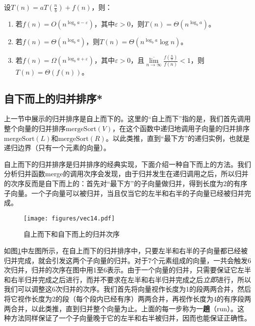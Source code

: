 \begin{theorem}[主定理]
设$T(n) = aT\left(\frac nb\right) + f(n)$，则：
\begin{enumerate}
    \item 若$f(n) = O\left(n^{\log _b a - \varepsilon}\right)$，其中$\varepsilon > 0$，则$T(n) = \Theta\left(n ^ {\log _b a}\right)$。
    \item 若$f(n) = \Theta\left(n^{\log _b a}\right)$，则$T(n) = \Theta\left(n ^ {\log _b a}\log n\right)$。
    \item 若$f(n) = \Omega\left(n^{\log _b a + \varepsilon}\right)$，其中$\varepsilon > 0$，且$\overline{\lim\limits_{n\to\infty}}\frac{f\left(\frac{n}b\right)}{f(n)}<1$，则$T(n) = \Theta\left(f(n)\right)$。
\end{enumerate}

\end{theorem}

\subsection{自下而上的归并排序*}
\label{sec:自下而上的归并排序}
上一节中展示的归并排序是自上而下的。这里的“自上而下”指的是，我们首先调用整个向量的归并排序$\mathrm{mergeSort}(V)$，在这个函数中递归地调用子向量的归并排序$\mathrm{mergeSort}(L)$和$\mathrm{mergeSort}(R)$。以此类推，直到“最下方”的递归实例，也就是递归边界（只有一个元素的向量）。

自上而下的归并排序是归并排序的经典实现，下面介绍一种自下而上的方法。我们分析归并函数merge的调用次序会发现，由于归并发生在递归调用之后，所以归并的次序反而是自下而上的：首先对“最下方”的子向量做归并，得到长度为2的有序子向量。一个子向量可以被归并，当且仅当它的左半和右半的子向量已经被归并完成。

\begin{figure}
  \centering
  \texttt{[image: figures/vec14.pdf]}
  \caption{自上而下和自下而上的归并次序}
  \label{fig:vec14}
\end{figure}

如图\ref{fig:vec14}中左图所示，在自上而下的归并排序中，只要左半和右半的子向量都已经被归并完成，就会引发这两个子向量的归并。对于7个元素组成的向量，一共会触发6次归并，归并的次序在图中用1至6表示。由于一个向量的归并，只需要保证它左半和右半归并完成之后进行，而并不要求在左半和右半归并完成之后\textit{立即}进行，所以我们可以调整这6次归并的次序。我们首先将向量视作长度为1的段两两合并，然后将它视作长度为2的段（每个段内已经有序）两两合并，再视作长度为4的有序段两两合并，以此类推，直到归并整个向量为止。上面的每一步称为一\textbf{趟}（run）。这种方法同样保证了一个子向量晚于它的左半和右半被归并，因而也能保证正确性。

